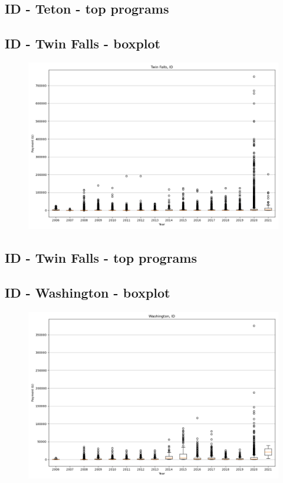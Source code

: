 \subsection*{ID - Teton - top programs}

\newpage
\subsection*{ID - Twin Falls - boxplot}
\begin{figure}[h]
\centering
\includegraphics[width=7in]{../output/boxplots/counties/Twin Falls-ID_boxplot.png}
\end{figure}


\subsection*{ID - Twin Falls - top programs}

\newpage
\subsection*{ID - Washington - boxplot}
\begin{figure}[h]
\centering
\includegraphics[width=7in]{../output/boxplots/counties/Washington-ID_boxplot.png}
\end{figure}


